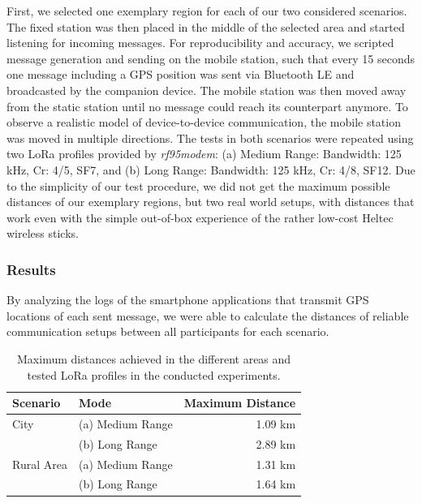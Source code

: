 First, we selected one exemplary region for each of our two considered scenarios. 
The fixed station was then placed in the middle of the selected area and started listening for incoming messages.
For reproducibility and accuracy, we scripted message generation and sending on the mobile station, such that every 15 seconds one message including a GPS position was sent via Bluetooth LE and broadcasted by the companion device.
The mobile station was then moved away from the static station until no message could reach its counterpart anymore.
To observe a realistic model of device-to-device communication, the mobile station was moved in multiple directions.
The tests in both scenarios were repeated using two LoRa  profiles provided by \textit{rf95modem}: (a) Medium Range: Bandwidth: 125 kHz, Cr: 4/5, SF7, and (b) Long Range: Bandwidth: 125 kHz, Cr: 4/8, SF12.
Due to the simplicity of our test procedure, we did not get the maximum possible distances of our exemplary regions, but two real world setups, with distances that work even with the simple out-of-box experience of the rather low-cost Heltec wireless sticks.

\subsubsection{Results}

By analyzing the logs of the smartphone applications that transmit GPS locations of each sent message, we were able to calculate the distances of reliable communication setups between all participants for each scenario.

\begin{table}[ht!]
    \centering
    \begin{tabular}{llr}
        \toprule
        \textbf{Scenario}    & \textbf{Mode}          & \textbf{Maximum Distance} \\
        \midrule
        City        & (a) Medium Range  &  1.09 km \\
        & (b) Long Range    &  2.89 km \\
        Rural Area  & (a) Medium Range  &  1.31 km \\
        & (b) Long Range   &  1.64 km \\
        \bottomrule
    \end{tabular}
    \caption{Maximum distances achieved in the different areas and tested LoRa profiles in the conducted experiments.}
    \label{tab:max_dist}
\end{table}

